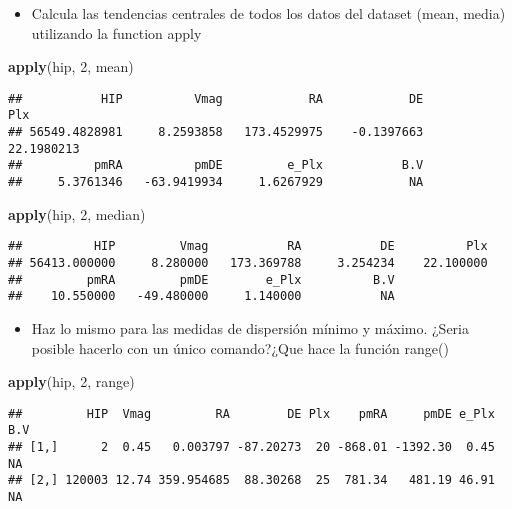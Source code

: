 \documentclass[]{article}
\newenvironment{Shaded}{\begin{snugshade}}{\end{snugshade}}
\newcommand{\KeywordTok}[1]{\textcolor[rgb]{0.13,0.29,0.53}{\textbf{#1}}}
\newcommand{\DecValTok}[1]{\textcolor[rgb]{0.00,0.00,0.81}{#1}}
\newcommand{\NormalTok}[1]{#1}
\providecommand{\tightlist}{%
  \setlength{\itemsep}{0pt}\setlength{\parskip}{0pt}}
\begin{document}
\begin{itemize}
\tightlist
\item
  Calcula las tendencias centrales de todos los datos del dataset (mean,
  media) utilizando la function apply
\end{itemize}

\begin{Shaded}
\begin{Highlighting}[]
\KeywordTok{apply}\NormalTok{(hip, }\DecValTok{2}\NormalTok{, mean)}
\end{Highlighting}
\end{Shaded}

\begin{verbatim}
##           HIP          Vmag            RA            DE           Plx 
## 56549.4828981     8.2593858   173.4529975    -0.1397663    22.1980213 
##          pmRA          pmDE         e_Plx           B.V 
##     5.3761346   -63.9419934     1.6267929            NA
\end{verbatim}

\begin{Shaded}
\begin{Highlighting}[]
\KeywordTok{apply}\NormalTok{(hip, }\DecValTok{2}\NormalTok{, median)}
\end{Highlighting}
\end{Shaded}

\begin{verbatim}
##          HIP         Vmag           RA           DE          Plx 
## 56413.000000     8.280000   173.369788     3.254234    22.100000 
##         pmRA         pmDE        e_Plx          B.V 
##    10.550000   -49.480000     1.140000           NA
\end{verbatim}

\begin{itemize}
\tightlist
\item
  Haz lo mismo para las medidas de dispersión mínimo y máximo. ¿Seria
  posible hacerlo con un único comando?¿Que hace la función range()
\end{itemize}

\begin{Shaded}
\begin{Highlighting}[]
\KeywordTok{apply}\NormalTok{(hip, }\DecValTok{2}\NormalTok{, range)}
\end{Highlighting}
\end{Shaded}

\begin{verbatim}
##         HIP  Vmag         RA        DE Plx    pmRA     pmDE e_Plx B.V
## [1,]      2  0.45   0.003797 -87.20273  20 -868.01 -1392.30  0.45  NA
## [2,] 120003 12.74 359.954685  88.30268  25  781.34   481.19 46.91  NA
\end{verbatim}
\end{document}
